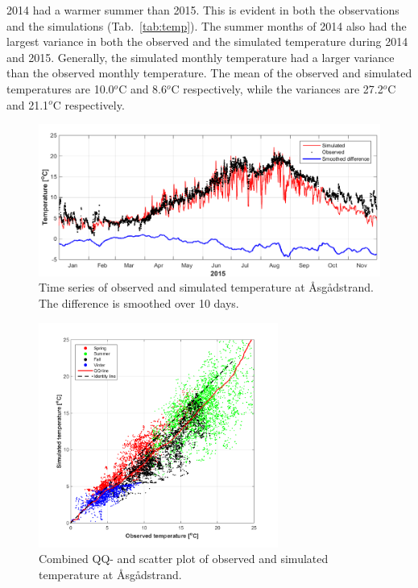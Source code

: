 2014 had a warmer summer than 2015. This is evident in both the observations and the simulations (Tab.~\ref{tab:temp}). The summer months of 2014 also had the largest variance in both the observed and the simulated temperature during 2014 and 2015. Generally, the simulated monthly temperature had a larger variance than the observed monthly temperature. The mean of the observed and simulated temperatures are 10.0$^o$C and 8.6$^o$C respectively, while the variances are 27.2$^o$C and 21.1$^o$C respectively.  

\begin{figure}[ht]
\centerline{
\includegraphics*[trim=0cm 0cm 0cm 0cm,clip=true,width=\textwidth]{Figurer/Temperatur_2015}}
\caption{\small
Time series of observed and simulated temperature at \AA sg\aa dstrand. The difference is smoothed over 10 days.}
\label{fig:temp_2015}
\end{figure}

\begin{figure}[htb]
\centerline{
\includegraphics*[trim=1cm 0cm 1cm 0cm,clip=true,width=0.7\textwidth]{Figurer/Temperatur_QQ_scatter}}
\caption{\small
Combined QQ- and scatter plot of observed and simulated temperature at \AA sg\aa dstrand.}
\label{fig:temp-QQ_scatter}
\end{figure}

